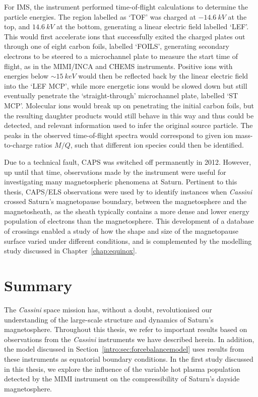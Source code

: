 For IMS, the instrument performed time-of-flight calculations to determine the particle energies. The region labelled as `TOF' was charged at $\SI{-14.6}{kV}$ at the top, and $\SI{+14.6}{kV}$ at the bottom, generating a linear electric field labelled `LEF'. This would first accelerate ions that successfully exited the charged plates out through one of eight carbon foils, labelled `FOILS', generating secondary electrons to be steered to a microchannel plate to measure the start time of flight, as in the MIMI/INCA and CHEMS instruments. Positive ions with energies below ${\sim}\SI{15}{keV}$ would then be reflected back by the linear electric field into the `LEF MCP', while more energetic ions would be slowed down but still eventually penetrate the `straight-through' microchannel plate, labelled `ST MCP'. Molecular ions would break up on penetrating the initial carbon foils, but the resulting daughter products would still behave in this way and thus could be detected, and relevant information used to infer the original source particle. The peaks in the observed time-of-flight spectra would correspond to given ion mass-to-charge ratios $M/Q$, such that different ion species could then be identified.

Due to a technical fault, CAPS was switched off permanently in 2012. However, up until that time, observations made by the instrument were useful for investigating many magnetospheric phenomena at Saturn. Pertinent to this thesis, CAPS/ELS observations were used by \citet{pilkington2015} to identify instances when \textit{Cassini} crossed Saturn's magnetopause boundary, between the magnetosphere and the magnetosheath, as the sheath typically contains a more dense and lower energy population of electrons than the magnetosphere. This development of a database of crossings enabled a study of how the shape and size of the magnetopause surface varied under different conditions, and is complemented by the modelling study discussed in Chapter~\ref{chap:equinox}.

\section{Summary}
The \textit{Cassini} space mission has, without a doubt, revolutionised our understanding of the large-scale structure and dynamics of Saturn's magnetosphere. Throughout this thesis, we refer to important results based on observations from the \textit{Cassini} instruments we have described herein. In addition, the \citet{achilleos2010a} model discussed in Section~\ref{intro:sec:forcebalancemodel} uses results from these instruments as equatorial boundary conditions. In the first study discussed in this thesis, we explore the influence of the variable hot plasma population detected by the MIMI instrument on the compressibility of Saturn's dayside magnetosphere.